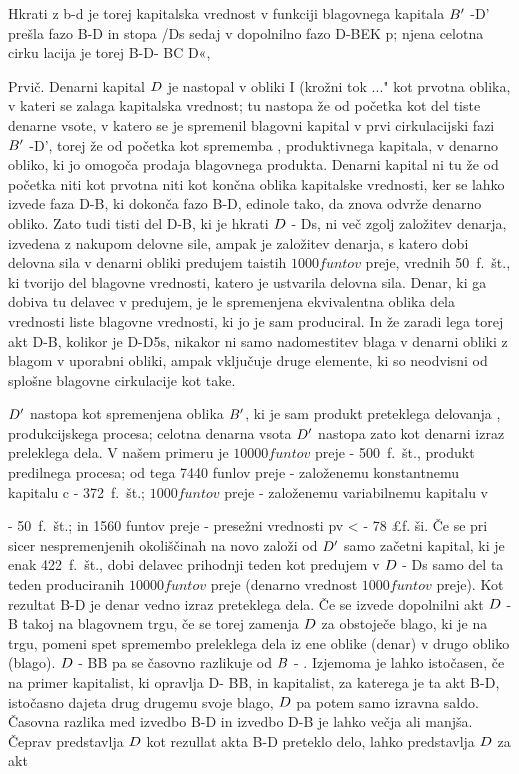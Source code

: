 \documentclass[kapital_02.tex]{subfiles}
\begin{document}
Hkrati z b-d je torej kapitalska vrednost v funkciji blagovnega kapitala \( B' \) -D' prešla fazo B-D in stopa /Ds sedaj v dopolnilno fazo D-BEK p; njena celotna cirku lacija je torej B-D- BC D«,

Prvič. Denarni kapital \( D \) je nastopal v obliki I (krožni tok \KPED...\KPED" kot prvotna oblika, v kateri se zalaga kapitalska vrednost; tu nastopa že od početka kot del tiste denarne vsote, v katero se je spremenil blagovni kapital v prvi cirkulacijski fazi \( B' \) -D', torej že od početka kot sprememba \KPEP, produktivnega kapitala, v denarno obliko, ki jo omogoča prodaja blagovnega produkta. Denarni kapital ni tu že od početka niti kot prvotna niti kot končna oblika kapitalske vrednosti, ker se lahko izvede faza D-B, ki dokonča fazo B-D, edinole tako, da znova odvrže denarno obliko. Zato tudi tisti del D-B, ki je hkrati \( D \) - Ds, ni več zgolj založitev denarja, izvedena z nakupom delovne sile, ampak je založitev denarja, s katero dobi delovna sila v denarni obliki predujem taistih \( 1000 funtov \) preje, vrednih 50~f.~št., ki tvorijo del blagovne vrednosti, katero je ustvarila delovna sila. Denar, ki ga dobiva tu delavec v predujem, je le spremenjena ekvivalentna oblika dela vrednosti liste blagovne vrednosti, ki jo je sam produciral. In že zaradi lega torej akt D-B, kolikor je D-D5s, nikakor ni samo nadomestitev blaga v denarni obliki z blagom v uporabni obliki, ampak vključuje druge elemente, ki so neodvisni od splošne blagovne cirkulacije kot take.

\( D' \) nastopa kot spremenjena oblika \( B' \), ki je sam produkt preteklega delovanja \KPEP, produkcijskega procesa; celotna denarna vsota \( D' \) nastopa zato kot denarni izraz preleklega dela. V našem primeru je \( 10000 funtov \) preje - 500~f.~št., produkt predilnega procesa; od tega 7440 funlov preje - založenemu konstantnemu kapitalu c - 372~f.~št.; \( 1000 funtov \) preje - založenemu variabilnemu kapitalu v

- 50~f.~št.; in 1560 funtov preje - presežni vrednosti pv < - 78 £f. ši. Če se pri sicer nespremenjenih okoliščinah na novo založi od \( D' \) samo začetni kapital, ki je enak 422~f.~št., dobi delavec prihodnji teden kot predujem v \( D \) - Ds samo del ta teden produciranih \( 10000 funtov \) preje (denarno vrednost \( 1000 funtov \) preje). Kot rezultat B-D je denar vedno izraz preteklega dela. Če se izvede dopolnilni akt \( D \) -B takoj na blagovnem trgu, če se torej zamenja \( D \) za obstoječe blago, ki je na trgu, pomeni spet spremembo preleklega dela iz ene oblike (denar) v drugo obliko (blago). \( D \) - BB pa se časovno razlikuje od \( B \) - \KPED. Izjemoma je lahko istočasen, če na primer kapitalist, ki opravlja D- BB, in kapitalist, za katerega je ta akt B-D, istočasno dajeta drug drugemu svoje blago, \( D \) pa potem samo izravna saldo. Časovna razlika med izvedbo B-D in izvedbo D-B je lahko večja ali manjša. Čeprav predstavlja \( D \) kot rezullat akta B-D preteklo delo, lahko predstavlja \( D \) za akt
\end{document}
